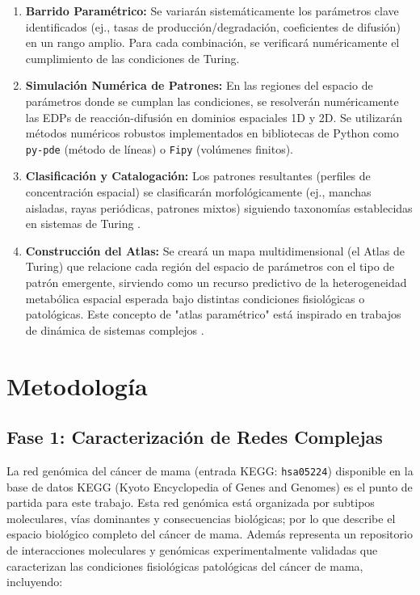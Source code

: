 \documentclass[12pt,spanish]{article}
\begin{document}
	\begin{enumerate}
		\item \textbf{Barrido Paramétrico:} Se variarán sistemáticamente los parámetros clave identificados (ej., tasas de producción/degradación, coeficientes de difusión) en un rango amplio. Para cada combinación, se verificará numéricamente el cumplimiento de las condiciones de Turing.
		
		\item \textbf{Simulación Numérica de Patrones:} En las regiones del espacio de parámetros donde se cumplan las condiciones, se resolverán numéricamente las EDPs de reacción-difusión en dominios espaciales 1D y 2D. Se utilizarán métodos numéricos robustos implementados en bibliotecas de Python como \texttt{py-pde} (método de líneas) \cite{logg2012} o \texttt{Fipy} (volúmenes finitos).
		
		\item \textbf{Clasificación y Catalogación:} Los patrones resultantes (perfiles de concentración espacial) se clasificarán morfológicamente (ej., manchas aisladas, rayas periódicas, patrones mixtos) siguiendo taxonomías establecidas en sistemas de Turing \cite{Kondo2010}.
		
		\item \textbf{Construcción del Atlas:} Se creará un mapa multidimensional (el Atlas de Turing) que relacione cada región del espacio de parámetros con el tipo de patrón emergente, sirviendo como un recurso predictivo de la heterogeneidad metabólica espacial esperada bajo distintas condiciones fisiológicas o patológicas. Este concepto de "atlas paramétrico" está inspirado en trabajos de dinámica de sistemas complejos \cite{strogatz2015}.
	\end{enumerate}
	
	\section{Metodología}
	
	\subsection*{Fase 1: Caracterización de Redes Complejas}
	
	La red genómica del cáncer de mama (entrada KEGG: \texttt{hsa05224}) disponible en la base de datos KEGG (Kyoto Encyclopedia of Genes and Genomes) es el punto de partida para este trabajo. Esta red genómica está organizada por subtipos moleculares, vías dominantes y consecuencias biológicas; por lo que describe el espacio biológico completo del cáncer de mama. Además representa un repositorio de interacciones moleculares y genómicas experimentalmente validadas que caracterizan las condiciones fisiológicas patológicas del cáncer de mama, incluyendo:
	
\end{document}
